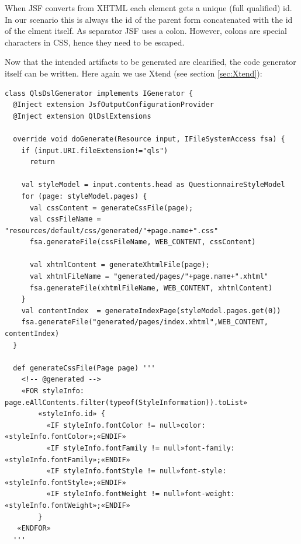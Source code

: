 When JSF converts from XHTML each element gets a unique (full qualified) id. In
our scenario this is always the id of the parent form concatenated with the id
of the elment itself. As separator JSF uses a colon. However, colons are special characters
in CSS, hence they need to be escaped.

Now that the intended artifacts to be generated are clearified, the code generator
itself can be written. Here again we use Xtend (see section \ref{sec:Xtend}):
\newline \newline
\begin{lstlisting}[language=Xtend]
class QlsDslGenerator implements IGenerator {
  @Inject extension JsfOutputConfigurationProvider
  @Inject extension QlDslExtensions
  
  override void doGenerate(Resource input, IFileSystemAccess fsa) {
    if (input.URI.fileExtension!="qls")
      return
            
    val styleModel = input.contents.head as QuestionnaireStyleModel
    for (page: styleModel.pages) {
      val cssContent = generateCssFile(page);
   	  val cssFileName = "resources/default/css/generated/"+page.name+".css"
   	  fsa.generateFile(cssFileName, WEB_CONTENT, cssContent)
   	
   	  val xhtmlContent = generateXhtmlFile(page);
   	  val xhtmlFileName = "generated/pages/"+page.name+".xhtml"
   	  fsa.generateFile(xhtmlFileName, WEB_CONTENT, xhtmlContent)
    }
    val contentIndex  = generateIndexPage(styleModel.pages.get(0))
    fsa.generateFile("generated/pages/index.xhtml",WEB_CONTENT, contentIndex)
  }

  def generateCssFile(Page page) '''
  	<!-- @generated -->
    «FOR styleInfo: page.eAllContents.filter(typeof(StyleInformation)).toList»
		«styleInfo.id» {
		  «IF styleInfo.fontColor != null»color: «styleInfo.fontColor»;«ENDIF»
		  «IF styleInfo.fontFamily != null»font-family: «styleInfo.fontFamily»;«ENDIF»
		  «IF styleInfo.fontStyle != null»font-style: «styleInfo.fontStyle»;«ENDIF»
		  «IF styleInfo.fontWeight != null»font-weight: «styleInfo.fontWeight»;«ENDIF»
		}
   «ENDFOR»
  '''
	

\end{lstlisting}
